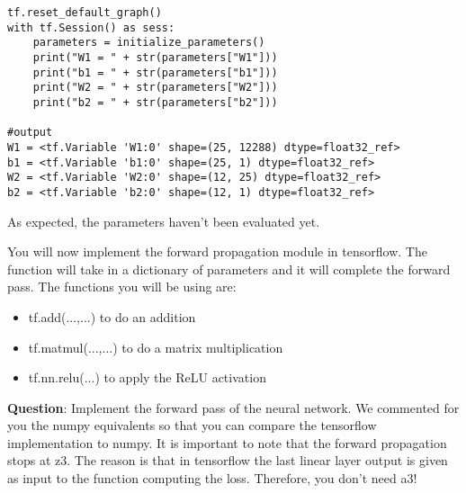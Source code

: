 \begin{verbatim}
tf.reset_default_graph()
with tf.Session() as sess:
    parameters = initialize_parameters()
    print("W1 = " + str(parameters["W1"]))
    print("b1 = " + str(parameters["b1"]))
    print("W2 = " + str(parameters["W2"]))
    print("b2 = " + str(parameters["b2"]))

#output
W1 = <tf.Variable 'W1:0' shape=(25, 12288) dtype=float32_ref>
b1 = <tf.Variable 'b1:0' shape=(25, 1) dtype=float32_ref>
W2 = <tf.Variable 'W2:0' shape=(12, 25) dtype=float32_ref>
b2 = <tf.Variable 'b2:0' shape=(12, 1) dtype=float32_ref>
\end{verbatim}  

As expected, the parameters haven't been evaluated yet.



You will now implement the forward propagation module in tensorflow. The function will take in a dictionary of parameters and it will complete the forward pass. The functions you will be using are:
\begin{itemize}
\item tf.add(...,...) to do an addition
\item tf.matmul(...,...) to do a matrix multiplication
\item tf.nn.relu(...) to apply the ReLU activation
\end{itemize}

{\textbf {Question}}: Implement the forward pass of the neural network. We commented for you the numpy equivalents so that you can compare the tensorflow implementation to numpy. It is important to note that the forward propagation stops at z3. The reason is that in tensorflow the last linear layer output is given as input to the function computing the loss. Therefore, you don't need a3!

